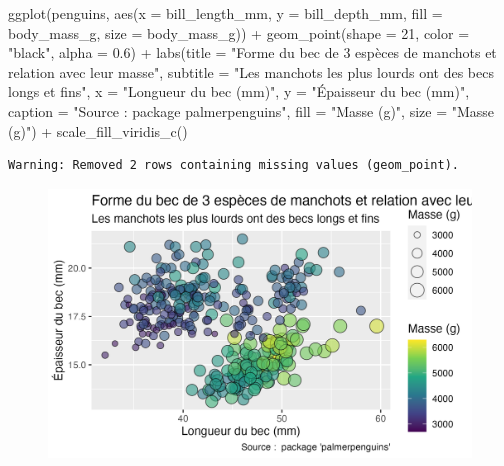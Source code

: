 \documentclass[
  letterpaper,
  DIV=11,
  numbers=noendperiod]{scrreprt}
\newenvironment{Shaded}{\begin{snugshade}}{\end{snugshade}}
\newcommand{\AttributeTok}[1]{\textcolor[rgb]{0.40,0.45,0.13}{#1}}
\newcommand{\DecValTok}[1]{\textcolor[rgb]{0.68,0.00,0.00}{#1}}
\newcommand{\FloatTok}[1]{\textcolor[rgb]{0.68,0.00,0.00}{#1}}
\newcommand{\FunctionTok}[1]{\textcolor[rgb]{0.28,0.35,0.67}{#1}}
\newcommand{\NormalTok}[1]{\textcolor[rgb]{0.00,0.23,0.31}{#1}}
\newcommand{\SpecialCharTok}[1]{\textcolor[rgb]{0.37,0.37,0.37}{#1}}
\newcommand{\StringTok}[1]{\textcolor[rgb]{0.13,0.47,0.30}{#1}}
\begin{document}
\begin{Shaded}
\begin{Highlighting}[]
\FunctionTok{ggplot}\NormalTok{(penguins, }\FunctionTok{aes}\NormalTok{(}\AttributeTok{x =}\NormalTok{ bill\_length\_mm, }\AttributeTok{y =}\NormalTok{ bill\_depth\_mm,}
                     \AttributeTok{fill =}\NormalTok{ body\_mass\_g, }\AttributeTok{size =}\NormalTok{ body\_mass\_g)) }\SpecialCharTok{+}
  \FunctionTok{geom\_point}\NormalTok{(}\AttributeTok{shape =} \DecValTok{21}\NormalTok{, }\AttributeTok{color =} \StringTok{"black"}\NormalTok{, }\AttributeTok{alpha =} \FloatTok{0.6}\NormalTok{) }\SpecialCharTok{+}
  \FunctionTok{labs}\NormalTok{(}\AttributeTok{title =} \StringTok{"Forme du bec de 3 espèces de manchots et relation avec leur masse"}\NormalTok{,}
       \AttributeTok{subtitle =} \StringTok{"Les manchots les plus lourds ont des becs longs et fins"}\NormalTok{,}
       \AttributeTok{x =} \StringTok{"Longueur du bec (mm)"}\NormalTok{,}
       \AttributeTok{y =} \StringTok{"Épaisseur du bec (mm)"}\NormalTok{,}
       \AttributeTok{caption =} \StringTok{"Source :  package \textquotesingle{}palmerpenguins\textquotesingle{}"}\NormalTok{,}
       \AttributeTok{fill =} \StringTok{"Masse (g)"}\NormalTok{,}
       \AttributeTok{size =} \StringTok{"Masse (g)"}\NormalTok{) }\SpecialCharTok{+}
  \FunctionTok{scale\_fill\_viridis\_c}\NormalTok{()}
\end{Highlighting}
\end{Shaded}

\begin{verbatim}
Warning: Removed 2 rows containing missing values (geom_point).
\end{verbatim}

\begin{figure}[H]

{\centering \includegraphics{./03-visualization_files/figure-pdf/unnamed-chunk-90-1.png}

}

\end{figure}
\end{document}
